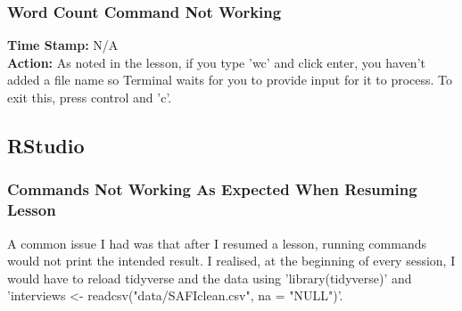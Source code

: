 \documentclass{article}
\begin{document}
\begin{FlushLeft}
\subsubsection{Word Count Command Not Working}
\textbf{Time Stamp:} N/A\\
\textbf{Action:} As noted in the lesson, if you type 'wc' and click enter, you haven't added a file name so Terminal waits for you to provide input for it to process. To exit this, press control and 'c'.\\

\subsection{RStudio}
\subsubsection{Commands Not Working As Expected When Resuming Lesson}
A common issue I had was that after I resumed a lesson, running commands would not print the intended result. I realised, at the beginning of every session, I would have to reload tidyverse and the data using 'library(tidyverse)' and 'interviews \textless - read\textunderscore csv("data/SAFI\textunderscore clean.csv", na = "NULL")'.


\end{FlushLeft}
\end{document}
